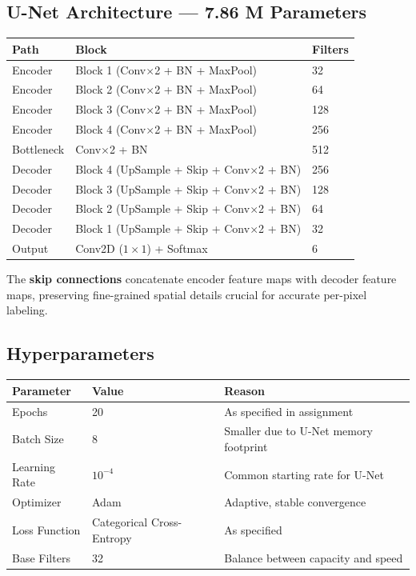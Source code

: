 \documentclass[12pt,a4paper]{article}
\begin{document}
\subsection{U-Net Architecture --- 7.86 M Parameters}

\begin{center}
\begin{tabular}{l l l}
\toprule
\textbf{Path} & \textbf{Block} & \textbf{Filters} \\
\midrule
Encoder   & Block 1 (Conv$\times$2 + BN + MaxPool) & 32  \\
Encoder   & Block 2 (Conv$\times$2 + BN + MaxPool) & 64  \\
Encoder   & Block 3 (Conv$\times$2 + BN + MaxPool) & 128 \\
Encoder   & Block 4 (Conv$\times$2 + BN + MaxPool) & 256 \\
\midrule
Bottleneck & Conv$\times$2 + BN & 512 \\
\midrule
Decoder   & Block 4 (UpSample + Skip + Conv$\times$2 + BN) & 256 \\
Decoder   & Block 3 (UpSample + Skip + Conv$\times$2 + BN) & 128 \\
Decoder   & Block 2 (UpSample + Skip + Conv$\times$2 + BN) & 64  \\
Decoder   & Block 1 (UpSample + Skip + Conv$\times$2 + BN) & 32  \\
\midrule
Output    & Conv2D ($1\times1$) + Softmax & 6 \\
\bottomrule
\end{tabular}
\end{center}

The \textbf{skip connections} concatenate encoder feature maps with decoder feature maps,
preserving fine-grained spatial details crucial for accurate per-pixel labeling.

\subsection{Hyperparameters}

\begin{center}
\begin{tabular}{l l l}
\toprule
\textbf{Parameter} & \textbf{Value} & \textbf{Reason} \\
\midrule
Epochs        & 20         & As specified in assignment \\
Batch Size    & 8          & Smaller due to U-Net memory footprint \\
Learning Rate & $10^{-4}$  & Common starting rate for U-Net \\
Optimizer     & Adam       & Adaptive, stable convergence \\
Loss Function & Categorical Cross-Entropy & As specified \\
Base Filters  & 32         & Balance between capacity and speed \\
\bottomrule
\end{tabular}
\end{center}
\end{document}
